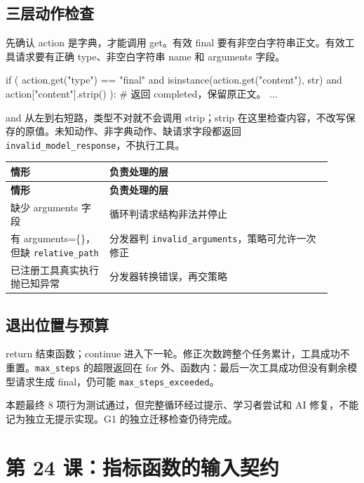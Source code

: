 \documentclass[UTF8,zihao=-4,fontset=fandol]{ctexart}
\begin{document}
\subsection{三层动作检查}

先确认 action 是字典，才能调用 get。有效 final 要有非空白字符串正文。有效工具请求要有正确 type、非空白字符串 name 和 arguments 字段。

\begin{Code}
if (
    action.get("type") == "final"
    and isinstance(action.get("content"), str)
    and action["content"].strip()
):
    # 返回 completed，保留原正文。
    ...
\end{Code}

and 从左到右短路，类型不对就不会调用 strip；strip 在这里检查内容，不改写保存的原值。未知动作、非字典动作、缺请求字段都返回 \nolinkurl{invalid_model_response}，不执行工具。

{\small\setlength{\tabcolsep}{4pt}
\renewcommand{\arraystretch}{1.25}
\begin{longtable}{>{\raggedright\arraybackslash}p{0.28\linewidth}>{\raggedright\arraybackslash}p{0.63\linewidth}}
\toprule
\textbf{情形} & \textbf{负责处理的层} \\
\midrule\endfirsthead
\toprule
\textbf{情形} & \textbf{负责处理的层} \\
\midrule\endhead
\bottomrule\endfoot
缺少 arguments 字段 & 循环判请求结构非法并停止 \\
有 arguments=\{\}，但缺 \nolinkurl{relative_path} & 分发器判 \nolinkurl{invalid_arguments}，策略可允许一次修正 \\
已注册工具真实执行抛已知异常 & 分发器转换错误，再交策略 \\
\end{longtable}}

\subsection{退出位置与预算}

return 结束函数；continue 进入下一轮。修正次数跨整个任务累计，工具成功不重置。\nolinkurl{max_steps} 的超限返回在 for 外、函数内：最后一次工具成功但没有剩余模型请求生成 final，仍可能 \nolinkurl{max_steps_exceeded}。

本题最终 8 项行为测试通过，但完整循环经过提示、学习者尝试和 AI 修复，不能记为独立无提示实现。G1 的独立迁移检查仍待完成。

\section{第 24 课：指标函数的输入契约}
\end{document}
